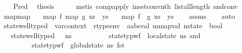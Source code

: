 \begin{isabellebody}
\ \ \isamarkupfalse%
\ Pred\ \isamarkupfalse%
\ {\isacharquery}{\kern0pt}thesis\isanewline
\ \ \ \ \isamarkupfalse%
\ {\isacharparenleft}{\kern0pt}metis\ comp{\isacharunderscore}{\kern0pt}apply\ in{\isacharunderscore}{\kern0pt}set{\isacharunderscore}{\kern0pt}conv{\isacharunderscore}{\kern0pt}nth\ list{\isacharunderscore}{\kern0pt}all{\isacharunderscore}{\kern0pt}length\ snd{\isacharunderscore}{\kern0pt}conv{\isacharparenright}{\kern0pt}\ \isanewline
{}\isamarkupfalse%
%
\endisatagproof
{\isafoldproof}%
%
\isadelimproof
\isanewline
%
\endisadelimproof
\isanewline
{}\isamarkupfalse%
\ map{\isacharunderscore}{\kern0pt}map{\isacharcolon}{\kern0pt}\isanewline
\ \ \ {\isachardoublequoteopen}map\ f\ {\isacharparenleft}{\kern0pt}map\ g\ xs{\isacharparenright}{\kern0pt}\ {\isacharequal}{\kern0pt}\ ys{\isachardoublequoteclose}\isanewline
\ \ \ {\isachardoublequoteopen}map\ {\isacharparenleft}{\kern0pt}f\ {\isasymcirc}\ g{\isacharparenright}{\kern0pt}\ xs\ {\isacharequal}{\kern0pt}\ ys{\isachardoublequoteclose}\isanewline
%
\isadelimproof
\ \ %
\endisadelimproof
%
\isatagproof
{}\isamarkupfalse%
\ assms\isanewline
\ \ \isamarkupfalse%
\ auto%
\endisatagproof
{\isafoldproof}%
%
\isadelimproof
\isanewline
%
\endisadelimproof
\isanewline
\isanewline
{}\isamarkupfalse%
\ state{\isacharunderscore}{\kern0pt}well{\isacharunderscore}{\kern0pt}typed\ {\isacharcolon}{\kern0pt}{\isacharcolon}{\kern0pt}\ {\isachardoublequoteopen}var{\isacharunderscore}{\kern0pt}context\ {\isasymRightarrow}\ rtype{\isacharunderscore}{\kern0pt}env\ {\isasymRightarrow}\ {\isacharparenleft}{\kern0pt}{\isacharprime}{\kern0pt}a{\isacharcolon}{\kern0pt}{\isacharcolon}{\kern0pt}absval{\isacharcomma}{\kern0pt}\ {\isacharprime}{\kern0pt}m{\isacharcolon}{\kern0pt}{\isacharcolon}{\kern0pt}mapval{\isacharparenright}{\kern0pt}\ nstate\ {\isasymRightarrow}\ bool{\isachardoublequoteclose}\isanewline
\ \ \ {\isachardoublequoteopen}state{\isacharunderscore}{\kern0pt}well{\isacharunderscore}{\kern0pt}typed\ {\isasymLambda}\ {\isasymOmega}\ ns\ {\isasymequiv}\isanewline
\ \ \ \ \ \ \ \ \ state{\isacharunderscore}{\kern0pt}typ{\isacharunderscore}{\kern0pt}wf\ {\isasymOmega}\ {\isacharparenleft}{\kern0pt}local{\isacharunderscore}{\kern0pt}state\ ns{\isacharparenright}{\kern0pt}\ {\isacharparenleft}{\kern0pt}snd\ {\isasymLambda}{\isacharparenright}{\kern0pt}\ {\isasymand}\isanewline
\ \ \ \ \ \ \ \ \ state{\isacharunderscore}{\kern0pt}typ{\isacharunderscore}{\kern0pt}wf\ {\isasymOmega}\ {\isacharparenleft}{\kern0pt}global{\isacharunderscore}{\kern0pt}state\ ns{\isacharparenright}{\kern0pt}\ {\isacharparenleft}{\kern0pt}fst\ {\isasymLambda}{\isacharparenright}{\kern0pt}\ {\isasymand}\isanewline

\end{isabellebody}
